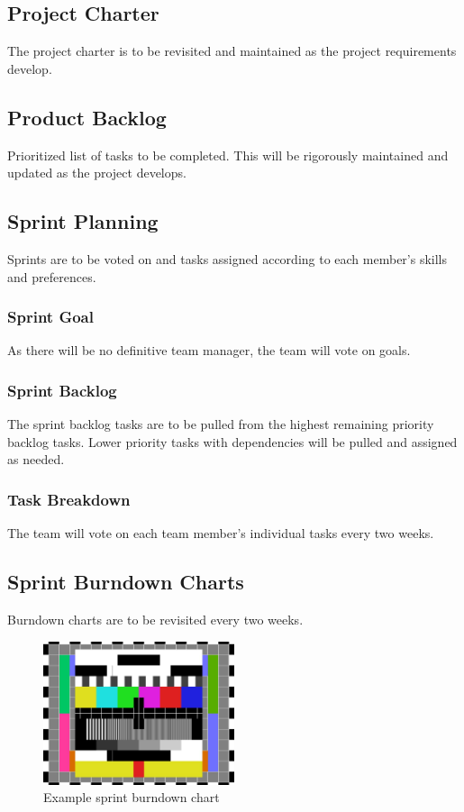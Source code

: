\subsection{Project Charter}
The project charter is to be revisited and maintained as the project requirements develop.

\subsection{Product Backlog}
Prioritized list of tasks to be completed. This will be rigorously maintained and updated as the project develops.

\subsection{Sprint Planning}
Sprints are to be voted on and tasks assigned according to each member's skills and preferences.

\subsubsection{Sprint Goal}
As there will be no definitive team manager, the team will vote on goals.

\subsubsection{Sprint Backlog}
The sprint backlog tasks are to be pulled from the highest remaining priority backlog tasks. Lower priority tasks with dependencies will be pulled and assigned as needed.

\subsubsection{Task Breakdown}
The team will vote on each team member's individual tasks every two weeks.

\subsection{Sprint Burndown Charts}
Burndown charts are to be revisited every two weeks.

\begin{figure}[h!]
    \centering
    \includegraphics[width=0.5\textwidth]{images/test_image}
    \caption{Example sprint burndown chart}
\end{figure}

